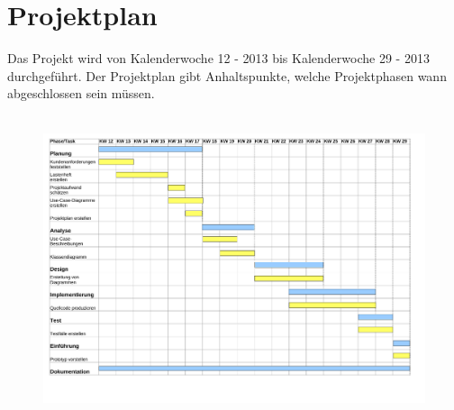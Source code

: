 \clearpage

\chapter{Projektplan}
Das Projekt wird von Kalenderwoche 12 - 2013 bis Kalenderwoche 29 - 2013 durchgeführt. Der Projektplan gibt Anhaltspunkte, welche Projektphasen wann abgeschlossen sein müssen.\\ \\

\begin{figure}[!h]
	\centering
    \includegraphics[width=\textwidth]{./projektplan.pdf}
	\label{layout_gesamt}
\end{figure}


